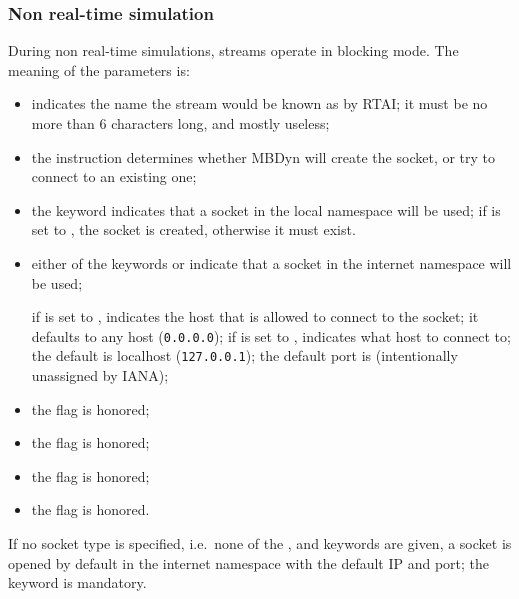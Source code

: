 \subsubsection{Non real-time simulation}
During non real-time simulations, streams operate in blocking mode.
The meaning of the parameters is:
\begin{itemize}
\item {} indicates the name the stream would be known as
by RTAI; it must be no more than 6 characters long, and mostly useless;

\item the instruction  determines whether MBDyn will create
the socket, or try to connect to an existing one;

\item the keyword  indicates that a socket 
in the local namespace will be used; if  is set to ,
the socket is created, otherwise it must exist.

\item either of the keywords  or  indicate that a socket
in the internet namespace will be used;

if  is set to ,  indicates 
the host that is allowed to connect to the socket; it defaults 
to any host (\texttt{0.0.0.0}); if  is set to ,
 indicates what host to connect to; the default 
is localhost (\texttt{127.0.0.1}); the default port is 
(intentionally unassigned by IANA);

\item the flag  is honored;

\item the flag  is honored;

\item the flag  is honored;

\item the flag  is honored.
\end{itemize}
If no socket type is specified, i.e.\ none of the ,  
and  keywords are given, a socket is opened by default 
in the internet namespace with the default IP and port; the 
keyword is mandatory.



